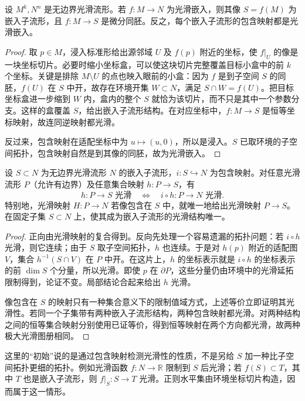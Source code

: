 \begin{proposition}\label{g1:prop:embedding-slice-characterization}
	设 \(M^k,N^n\) 是无边界光滑流形。若 \(f:M\to N\) 为光滑嵌入，则其像 \(S=f(M)\) 为嵌入子流形，且 \(f:M\to S\) 是微分同胚。反之，每个嵌入子流形的包含映射都是光滑嵌入。
\end{proposition}
\begin{proof}
	取 \(p\in M\)，浸入标准形给出源邻域 \(U\) 及 \(f(p)\) 附近的坐标，使 \(f|_U\) 的像是一块坐标切片。必要时缩小坐标盒，可以使这块切片完整覆盖目标小盒中的前 \(k\) 个坐标。关键是排除 \(M\setminus U\) 的点也映入眼前的小盒：因为 \(f\) 是到子空间 \(S\) 的同胚，\(f(U)\) 在 \(S\) 中开，故存在环境开集 \(W\subset N\)，满足 \(S\cap W=f(U)\)。把目标坐标盒进一步缩到 \(W\) 内，盒内的整个 \(S\) 就恰为该切片，而不只是其中一个参数分支。这样的盒覆盖 \(S\)，给出嵌入子流形结构。在对应坐标中，\(f:M\to S\) 是恒等坐标映射，故连同逆映射都光滑。

	反过来，包含映射在适配坐标中为 \(u\mapsto(u,0)\)，所以是浸入。\(S\) 已取环境的子空间拓扑，包含映射自然是到其像的同胚，故为光滑嵌入。
\end{proof}

\begin{proposition}\label{g1:prop:embedded-initial-property}
	设 \(S\subset N\) 为无边界光滑流形 \(N\) 的嵌入子流形，\(i:S\hookrightarrow N\) 为包含映射。对任意光滑流形 \(P\)（允许有边界）及任意集合映射 \(h:P\to S\)，有
	\[
		h:P\to S\text{ 光滑}\quad\Longleftrightarrow\quad i\circ h:P\to N\text{ 光滑}.
	\]
	特别地，光滑映射 \(H:P\to N\) 若像包含在 \(S\) 中，就唯一地给出光滑映射 \(P\to S\)。在固定子集 \(S\subset N\) 上，使其成为嵌入子流形的光滑结构唯一。
\end{proposition}
\begin{proof}
	正向由光滑映射的复合得到。反向先处理一个容易遗漏的拓扑问题：若 \(i\circ h\) 光滑，则它连续；由于 \(S\) 取子空间拓扑，\(h\) 也连续。于是对 \(h(p)\) 附近的适配图 \(V\)，集合 \(h^{-1}(S\cap V)\) 在 \(P\) 中开。在这片上，\(h\) 的坐标表示就是 \(i\circ h\) 的坐标表示的前 \(\dim S\) 个分量，所以光滑。即使 \(p\) 在 \(\partial P\)，这些分量仍由环境中的光滑延拓限制得到，论证不变。局部结论合起来给出 \(h\) 光滑。

	像包含在 \(S\) 的映射只有一种集合意义下的限制值域方式，上述等价立即证明其光滑性。若同一个子集带有两种嵌入子流形结构，两种包含映射都光滑。对两种结构之间的恒等集合映射分别使用已证等价，得到恒等映射在两个方向都光滑，故两种极大光滑图册相同。
\end{proof}

这里的“初始”说的是通过包含映射检测光滑性的性质，不是另给 \(S\) 加一种比子空间拓扑更细的拓扑。例如光滑函数 \(f:N\to\mathbb R\) 限制到 \(S\) 后光滑；若 \(f(S)\subset T\)，其中 \(T\) 也是嵌入子流形，则 \(f|_S:S\to T\) 光滑。正则水平集由环境坐标切片构造，因而属于这一情形。

